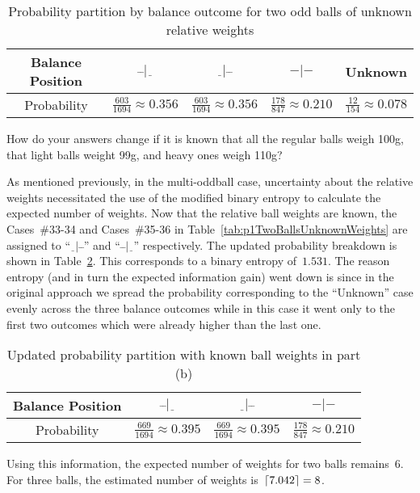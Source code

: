   \begin{table}
    \centering
    \caption{Probability partition by balance outcome for two odd balls of unknown relative weights}\label{tab:twoBallProbabilityBreakdown}
    \begin{tabular}{|c||c|c|c|c|}
      \hline
      Balance Position & $\bar{~}\bar{~}|\underline{~~}$  & $\underline{~~}|\bar{~}\bar{~}$  & $-|-$ & Unknown \\\hline
      Probability      & $\frac{603}{1694} \approx 0.356$ & $\frac{603}{1694} \approx 0.356$ & $\frac{178}{847} \approx 0.210$ & $\frac{12}{154} \approx 0.078$    \\\hline
    \end{tabular}
  \end{table}

\begin{subproblem}
  How do your answers change if it is known that all the regular balls weigh 100g, that light balls weight 99g, and heavy ones weigh 110g?
\end{subproblem}

  As mentioned previously, in the multi-oddball case, uncertainty about the relative weights necessitated the use of the modified binary entropy to calculate the expected number of weights.  Now that the relative ball weights are known, the Cases~\#33-34 and Cases~\#35-36 in Table~\ref{tab:p1TwoBallsUnknownWeights} are assigned to ``${\underline{~~}|\bar{~}\bar{~}}$'' and ``${\bar{~}\bar{~}|\underline{~~}}$'' respectively.  The updated probability breakdown is shown in Table~\ref{tab:twoBallProbabilityBreakdownKnownWeights}.  This corresponds to a binary entropy of~$1.531$.  The reason entropy (and in turn the expected information gain) went down is since in the original approach we spread the probability corresponding to the ``Unknown'' case evenly across the three balance outcomes while in this case it went only to the first two outcomes which were already higher than the last one.
  
  \begin{table}
    \centering
    \caption{Updated probability partition with known ball weights in part (b)}\label{tab:twoBallProbabilityBreakdownKnownWeights}
    \begin{tabular}{|c||c|c|c|}
      \hline
      Balance Position & $\bar{~}\bar{~}|\underline{~~}$  & $\underline{~~}|\bar{~}\bar{~}$  & $-|-$ \\\hline
      Probability      & $\frac{669}{1694} \approx 0.395$ & $\frac{669}{1694} \approx 0.395$ & $\frac{178}{847} \approx 0.210$   \\\hline
    \end{tabular}
  \end{table}
  
  Using this information, the expected number of weights for two balls remains~6.  For three balls, the estimated number of weights is~${\ceil*{7.042} = 8}$.
  
  